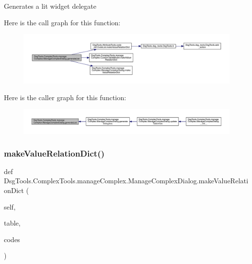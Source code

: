 \begin{DoxyVerb}Generates a lit widget delegate
\end{DoxyVerb}
 Here is the call graph for this function\+:
\nopagebreak
\begin{figure}[H]
\begin{center}
\leavevmode
\includegraphics[width=350pt]{class_dsg_tools_1_1_complex_tools_1_1manage_complex_1_1_manage_complex_dialog_a2fddbb8b09feb6e440397a333066d0fd_cgraph}
\end{center}
\end{figure}
Here is the caller graph for this function\+:
\nopagebreak
\begin{figure}[H]
\begin{center}
\leavevmode
\includegraphics[width=350pt]{class_dsg_tools_1_1_complex_tools_1_1manage_complex_1_1_manage_complex_dialog_a2fddbb8b09feb6e440397a333066d0fd_icgraph}
\end{center}
\end{figure}
\mbox{\label{class_dsg_tools_1_1_complex_tools_1_1manage_complex_1_1_manage_complex_dialog_ad7cddc5c0c4e2588da86d65c5baee3ee}} 
\subsubsection{\texorpdfstring{make\+Value\+Relation\+Dict()}{makeValueRelationDict()}}
{\footnotesize\ttfamily def Dsg\+Tools.\+Complex\+Tools.\+manage\+Complex.\+Manage\+Complex\+Dialog.\+make\+Value\+Relation\+Dict (\begin{DoxyParamCaption}\item[{}]{self,  }\item[{}]{table,  }\item[{}]{codes }\end{DoxyParamCaption})}

